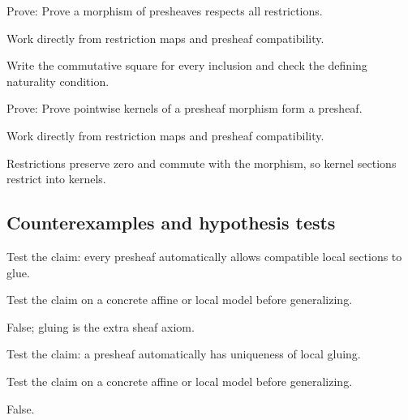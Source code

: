 \begin{exercise}[Morphisms]\label{exr:vi12-expand-08}
Prove: Prove a morphism of presheaves respects all restrictions.
\end{exercise}
\begin{hint}
Work directly from restriction maps and presheaf compatibility.
\end{hint}
\begin{solution}
Write the commutative square for every inclusion and check the defining naturality condition.
\end{solution}

\begin{exercise}\label{exr:vi12-expand-09}
Prove: Prove pointwise kernels of a presheaf morphism form a presheaf.
\end{exercise}
\begin{hint}
Work directly from restriction maps and presheaf compatibility.
\end{hint}
\begin{solution}
Restrictions preserve zero and commute with the morphism, so kernel sections restrict into kernels.
\end{solution}

\subsection*{Counterexamples and hypothesis tests}

\begin{exercise}[Gluing]\label{exr:vi12-expand-10}
Test the claim: every presheaf automatically allows compatible local sections to glue.
\end{exercise}
\begin{hint}
Test the claim on a concrete affine or local model before generalizing.
\end{hint}
\begin{solution}
False; gluing is the extra sheaf axiom.
\end{solution}

\begin{exercise}[Uniqueness]\label{exr:vi12-expand-11}
Test the claim: a presheaf automatically has uniqueness of local gluing.
\end{exercise}
\begin{hint}
Test the claim on a concrete affine or local model before generalizing.
\end{hint}
\begin{solution}
False.
\end{solution}

